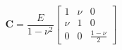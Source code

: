 \documentclass[varwidth,convert={density=500,size=1080x800,outext=.png}]{article}
\begin{document}
$$\mathbf C=\frac{E}{1 - \nu^2}
            \begin{bmatrix}
              1   & \nu & 0                 \\
              \nu & 1   & 0                 \\
              0   & 0   & \frac{1 - \nu}{2}
            \end{bmatrix}$$
\newline
\end{document}

